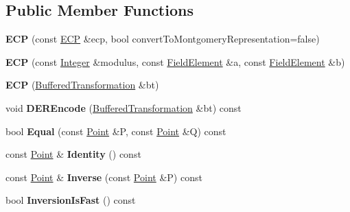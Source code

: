 \subsection*{Public Member Functions}
\begin{DoxyCompactItemize}
\item 
\hypertarget{class_e_c_p_a75052eac63ed5622c1e558852cd2d1a4}{
{\bfseries ECP} (const \hyperlink{class_e_c_p}{ECP} \&ecp, bool convertToMontgomeryRepresentation=false)}
\label{class_e_c_p_a75052eac63ed5622c1e558852cd2d1a4}

\item 
\hypertarget{class_e_c_p_a7dbe4a90840d3b7cb23412a65414f4f5}{
{\bfseries ECP} (const \hyperlink{class_integer}{Integer} \&modulus, const \hyperlink{class_integer}{FieldElement} \&a, const \hyperlink{class_integer}{FieldElement} \&b)}
\label{class_e_c_p_a7dbe4a90840d3b7cb23412a65414f4f5}

\item 
\hypertarget{class_e_c_p_aa7f09fe942958b0b0933fa9a9a55fa6d}{
{\bfseries ECP} (\hyperlink{class_buffered_transformation}{BufferedTransformation} \&bt)}
\label{class_e_c_p_aa7f09fe942958b0b0933fa9a9a55fa6d}

\item 
\hypertarget{class_e_c_p_abd3375eb0b264264e22b624dc127f8c4}{
void {\bfseries DEREncode} (\hyperlink{class_buffered_transformation}{BufferedTransformation} \&bt) const }
\label{class_e_c_p_abd3375eb0b264264e22b624dc127f8c4}

\item 
\hypertarget{class_e_c_p_ab7ccece5f3c8ae31dd0a82bf92ba5ec5}{
bool {\bfseries Equal} (const \hyperlink{struct_e_c_p_point}{Point} \&P, const \hyperlink{struct_e_c_p_point}{Point} \&Q) const }
\label{class_e_c_p_ab7ccece5f3c8ae31dd0a82bf92ba5ec5}

\item 
\hypertarget{class_e_c_p_a2cc4cc2d904bcd16a00bcb140411b7e5}{
const \hyperlink{struct_e_c_p_point}{Point} \& {\bfseries Identity} () const }
\label{class_e_c_p_a2cc4cc2d904bcd16a00bcb140411b7e5}

\item 
\hypertarget{class_e_c_p_a92c774cedd39179daabc3373a9282465}{
const \hyperlink{struct_e_c_p_point}{Point} \& {\bfseries Inverse} (const \hyperlink{struct_e_c_p_point}{Point} \&P) const }
\label{class_e_c_p_a92c774cedd39179daabc3373a9282465}

\item 
\hypertarget{class_e_c_p_a1081a3e2d1056cae1b643925fb4cd146}{
bool {\bfseries InversionIsFast} () const }
\label{class_e_c_p_a1081a3e2d1056cae1b643925fb4cd146}


\end{DoxyCompactItemize}
